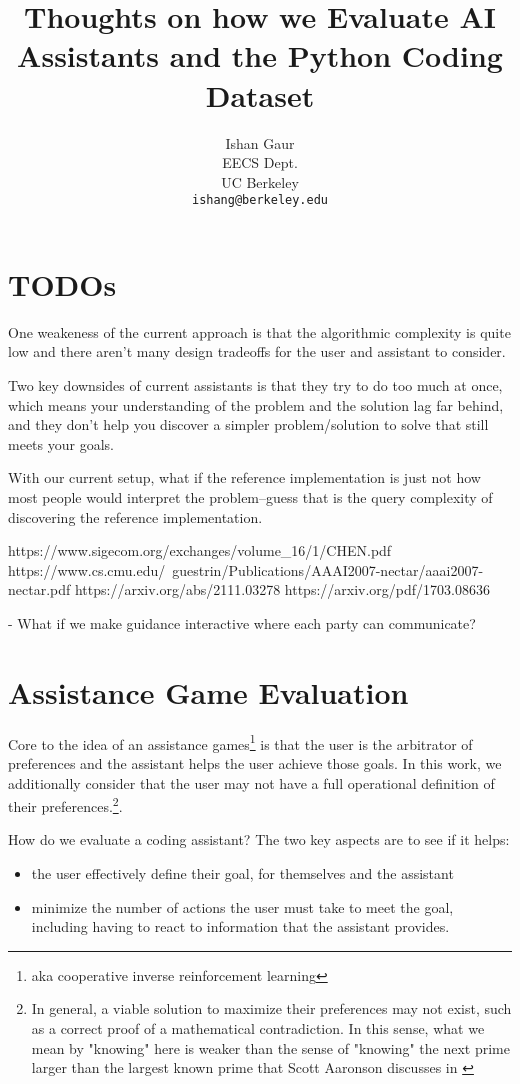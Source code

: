 \documentclass{article}
\title{Thoughts on how we Evaluate AI Assistants and the Python Coding Dataset}
\author{
  Ishan Gaur \\
  EECS Dept.\\
  UC Berkeley\\
  \texttt{ishang@berkeley.edu} \\
}
\begin{document}
\maketitle

\section{TODOs}
One weakeness of the current approach is that the algorithmic complexity is quite low and there aren't many design tradeoffs for the user and assistant to consider.

Two key downsides of current assistants is that they try to do too much at once, which means your understanding of the problem and the solution lag far behind, and they don't help you discover a simpler problem/solution to solve that still meets your goals.

With our current setup, what if the reference implementation is just not how most people would interpret the problem--guess that is the query complexity of discovering the reference implementation.

https://www.sigecom.org/exchanges/volume_16/1/CHEN.pdf
https://www.cs.cmu.edu/~guestrin/Publications/AAAI2007-nectar/aaai2007-nectar.pdf
https://arxiv.org/abs/2111.03278
https://arxiv.org/pdf/1703.08636

- What if we make guidance interactive where each party can communicate?

\section{Assistance Game Evaluation}
Core to the idea of an assistance games\footnote{aka cooperative inverse reinforcement learning} is that the user is the arbitrator of preferences and the assistant helps the user achieve those goals. In this work, we additionally consider that the user may not have a full operational definition of their preferences.\footnote{In general, a viable solution to maximize their preferences may not exist, such as a correct proof of a mathematical contradiction. In this sense, what we mean by "knowing" here is weaker than the sense of "knowing" the next prime larger than the largest known prime that Scott Aaronson discusses in \cite{aaronson201310}}.

How do we evaluate a coding assistant? The two key aspects are to see if it helps:
\begin{itemize}
    \item the user effectively define their goal, for themselves and the assistant
    \item minimize the number of actions the user must take to meet the goal, including having to react to information that the assistant provides.
\end{itemize}
\end{document}
